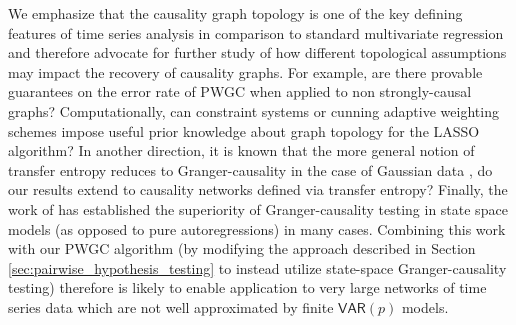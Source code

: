 \documentclass{statsoc}
\def\VAR{\mathsf{VAR}}  %
\begin{document}
We emphasize that the causality graph topology is one of the key
defining features of time series analysis in comparison to standard
multivariate regression and therefore advocate for further study of
how different topological assumptions may impact the recovery of
causality graphs.  For example, are there provable guarantees on the
error rate of PWGC when applied to non strongly-causal graphs?
Computationally, can constraint systems or cunning adaptive weighting
schemes impose useful prior knowledge about graph topology for the
LASSO algorithm?  In another direction, it is known that the more
general notion of transfer entropy reduces to Granger-causality in the
case of Gaussian data \cite{barnett2009granger}, do our results extend
to causality networks defined via transfer entropy?  Finally, the work
of \cite{barnett2015granger} has established the superiority of
Granger-causality testing in state space models (as opposed to pure
autoregressions) in many cases.  Combining this work with our PWGC
algorithm (by modifying the approach described in Section
\ref{sec:pairwise_hypothesis_testing} to instead utilize state-space
Granger-causality testing) therefore is likely to enable application
to very large networks of time series data which are not well
approximated by finite $\VAR(p)$ models.

% 

\end{document}
